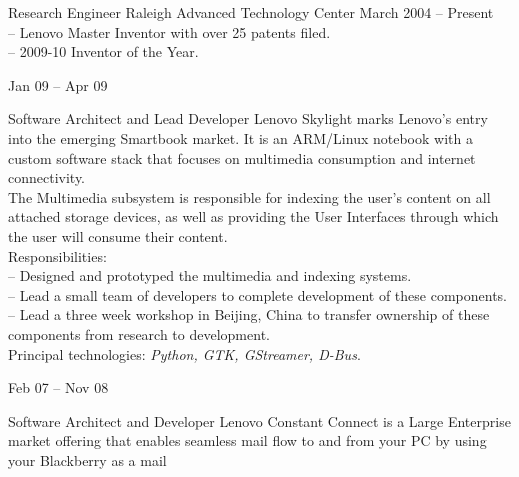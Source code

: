 \documentclass[letterpaper, 11pt]{article}
\begin{document}
    \begin{resume}
        \begin{category}{}
                                         {Research Engineer}
                     {Raleigh Advanced Technology Center} {March 2004 -- Present}
            \\[1ex]
            -- Lenovo Master Inventor with over 25 patents filed. \\
            -- 2009-10 Inventor of the Year. \\
        \end{category}
        \begin{subcategory}{Jan 09 -- Apr 09}
            \begin{block}
                 {Software Architect and Lead Developer}
                Lenovo Skylight marks Lenovo's entry into the emerging Smartbook market.
                It is an ARM/Linux notebook with a custom software stack that focuses
                on multimedia consumption and internet connectivity.
                \\[1ex]
                The Multimedia subsystem is responsible for indexing the user's content on all
                attached storage devices, as well as providing the User Interfaces through which
                the user will consume their content.
                \\[1ex]
                Responsibilities: \\
                -- Designed and prototyped the multimedia and indexing systems. \\
                -- Lead a small team of developers to complete development of these components. \\
                -- Lead a three week workshop in Beijing, China to transfer ownership of these components from research to development.
                \\[1ex]
                Principal technologies: \emph{Python, GTK, GStreamer, D-Bus}.
                \bigskip
            \end{block}
        \end{subcategory}
        \begin{subcategory}{Feb 07 -- Nov 08}
            \begin{block}
                 {Software Architect and Developer}
                Lenovo Constant Connect is a Large Enterprise market offering that enables
                seamless mail flow to and from your PC by using your Blackberry as a mail

\end{block}
\end{subcategory}
\end{resume}
\end{document}

